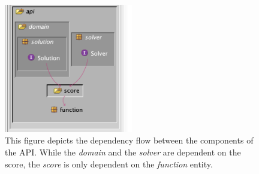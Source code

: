 \begin{figure}
    \centering
    \includegraphics[width=0.5\textwidth]{figures/step2/dep_api.png}
    \caption{This figure depicts the dependency flow between the components of the API. While the \textit{domain} and the \textit{solver} are dependent on the score, the \textit{score} is only dependent on the \textit{function} entity.}
    \label{fig:dep_api}
\end{figure}
